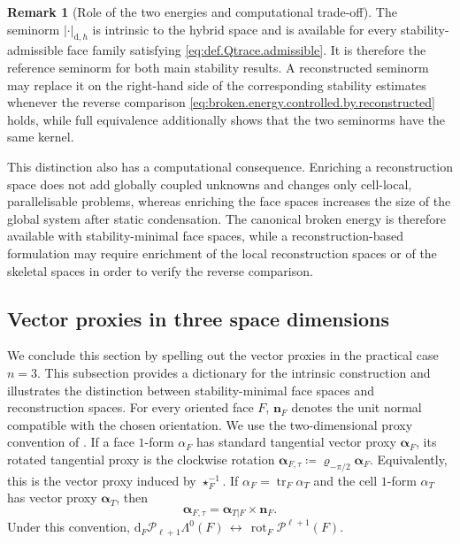 \documentclass[a4paper,11pt]{article}
\theoremstyle{definition}
\newtheorem{remark}[theorem]{Remark}
\newcommand{\DIFF}{\mathrm{d}}
\newcommand{\PL}[2]{\mathcal{P}_{#1}\Lambda^{#2}}
\newcommand{\trc}{\operatorname{tr}}
\begin{document}
\begin{remark}[Role of the two energies and computational trade-off]
\label{rem:role.broken.reconstructed.energies}
The seminorm $|\cdot|_{\DIFF,h}$ is intrinsic to the hybrid space and is available for every stability-admissible face family satisfying \eqref{eq:def.Qtrace.admissible}.
It is therefore the reference seminorm for both main stability results.
A reconstructed seminorm may replace it on the right-hand side of the corresponding stability estimates whenever the reverse comparison \eqref{eq:broken.energy.controlled.by.reconstructed} holds, while full equivalence additionally shows that the two seminorms have the same kernel.

This distinction also has a computational consequence.
Enriching a reconstruction space does not add globally coupled unknowns and changes only cell-local, parallelisable problems, whereas enriching the face spaces increases the size of the global system after static condensation.
The canonical broken energy is therefore available with stability-minimal face spaces, while a reconstruction-based formulation may require enrichment of the local reconstruction spaces or of the skeletal spaces in order to verify the reverse comparison.
\end{remark}

\subsection{Vector proxies in three space dimensions}
\label{sec:vector.proxies}

We conclude this section by spelling out the vector proxies in the practical case $n=3$.
This subsection provides a dictionary for the intrinsic construction and illustrates the distinction between stability-minimal face spaces and reconstruction spaces.
For every oriented face $F$, $\boldsymbol n_F$ denotes the unit normal compatible with the chosen orientation.
We use the two-dimensional proxy convention of \cite[Example~2 and Appendix~A]{Bonaldi.Di-Pietro.ea:24}. If a face $1$-form $\alpha_F$ has standard tangential vector proxy $\boldsymbol\alpha_F$, its rotated tangential proxy is the clockwise rotation $\boldsymbol\alpha_{F,\tau} \coloneqq \varrho_{-\pi/2}\boldsymbol\alpha_F$.
Equivalently, this is the vector proxy induced by $\star_F^{-1}$.
If $\alpha_F=\trc_F\alpha_T$ and the cell $1$-form $\alpha_T$ has vector proxy $\boldsymbol\alpha_T$, then
\[
\boldsymbol\alpha_{F,\tau}
=\boldsymbol\alpha_{T|F}\times\boldsymbol n_F.
\]
Under this convention, $\DIFF_F\PL{\ell+1}{0}(F) \,\leftrightarrow\, \operatorname{rot}_F\mathcal P^{\ell+1}(F)$.
\end{document}
